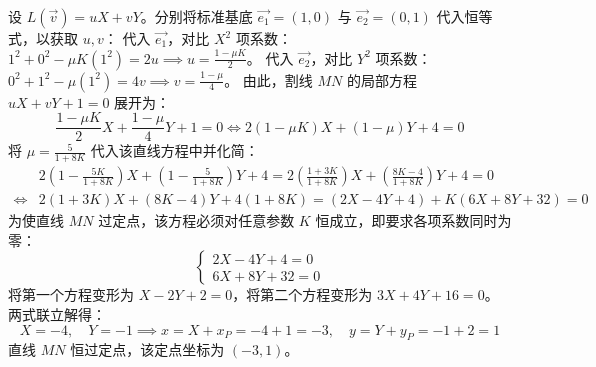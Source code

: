 \begin{solution}
设 $L(\vec{v}) = uX + vY$。分别将标准基底 $\vec{e_1} = (1,0)$ 与 $\vec{e_2} = (0,1)$ 代入恒等式，以获取 $u, v$：
代入 $\vec{e_1}$，对比 $X^2$ 项系数：$1^2 + 0^2 - \mu K(1^2) = 2u \implies u = \frac{1 - \mu K}{2}$。
代入 $\vec{e_2}$，对比 $Y^2$ 项系数：$0^2 + 1^2 - \mu(1^2) = 4v \implies v = \frac{1 - \mu}{4}$。
由此，割线 $MN$ 的局部方程 $uX + vY + 1 = 0$ 展开为：
$$ \frac{1 - \mu K}{2} X + \frac{1 - \mu}{4} Y + 1 = 0 \Leftrightarrow 2(1 - \mu K)X + (1 - \mu)Y + 4 = 0$$
将 $\mu = \frac{5}{1+8K}$ 代入该直线方程中并化简：
\begin{align*}
&2\left(1 - \frac{5K}{1+8K}\right)X + \left(1 - \frac{5}{1+8K}\right)Y + 4 = 2\left(\frac{1+3K}{1+8K}\right)X + \left(\frac{8K-4}{1+8K}\right)Y + 4 = 0\\
\Leftrightarrow & 2(1+3K)X + (8K-4)Y + 4(1+8K) = (2X - 4Y + 4) + K(6X + 8Y + 32) = 0 
\end{align*}
为使直线 $MN$ 过定点，该方程必须对任意参数 $K$ 恒成立，即要求各项系数同时为零：
$$ \begin{cases} 2X - 4Y + 4 = 0 \\ 6X + 8Y + 32 = 0 \end{cases} $$
将第一个方程变形为 $X - 2Y + 2 = 0$，将第二个方程变形为 $3X + 4Y + 16 = 0$。两式联立解得：
$$ X = -4, \quad Y = -1 \implies x = X + x_P = -4 + 1 = -3, \quad y = Y + y_P = -1 + 2 = 1 $$
直线 $MN$ 恒过定点，该定点坐标为 $(-3, 1)$。
\end{solution}

